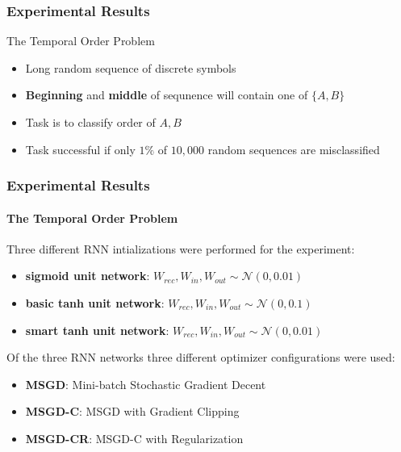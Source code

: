 \documentclass{beamer}
\begin{document}
\begin{frame}
	\frametitle{Experimental Results}
		
	The Temporal Order Problem
	\begin{itemize}
		\item{Long random sequence of discrete symbols}
		\item{\textbf{Beginning} and \textbf{middle} of sequnence will contain one of $\{A, B\}$}
		\item{Task is to classify order of $A, B$}
		\item{Task successful if only $1\%$ of $10,000$ random sequences are misclassified}
	\end{itemize}
	
	
\end{frame}


\begin{frame}
	\frametitle{Experimental Results}	
	\framesubtitle{The Temporal Order Problem}
	Three different RNN intializations were performed for the experiment:
	
	\begin{itemize}
		\item{\textbf{sigmoid unit network}: $W_{rec}, W_{in}, W_{out} \sim \mathcal{N}(0, 0.01)$}
		\item{\textbf{basic tanh unit network}: $W_{rec}, W_{in}, W_{out} \sim \mathcal{N}(0, 0.1)$}		
		\item{\textbf{smart tanh unit network}: $W_{rec}, W_{in}, W_{out} \sim \mathcal{N}(0, 0.01)$} 
	\end{itemize}
	
	Of the three RNN networks three different optimizer configurations were used:
	
	\begin{itemize}
		\item{\textbf{MSGD}: Mini-batch Stochastic Gradient Decent}
		\item{\textbf{MSGD-C}: MSGD with Gradient Clipping}
		\item{\textbf{MSGD-CR}: MSGD-C with Regularization}
	\end{itemize}
\end{frame}
\end{document}
